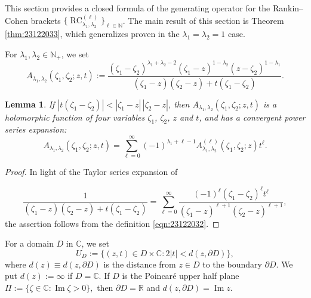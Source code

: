 \documentclass[12pt]{amsart}
\newcommand{\RC}{\operatorname{RC}}
\theoremstyle{plain} %
\newtheorem{lemma}{Lemma} %
\theoremstyle{definition} %
\theoremstyle{remark} %
\begin{document}
This section provides a closed formula
 of the generating operator
 for the Rankin--Cohen brackets
 $\{\RC_{\lambda_1, \lambda_2}^{(\ell)}\}_{\ell \in {\mathbb{N}}}$.  
The main result of this section is Theorem \ref{thm:23122033}, 
 which generalizes
 \cite[Thm.\ 2.3]{KPgen}
 proven in the $\lambda_1=\lambda_2=1$ case.  





For $\lambda_1, \lambda_2 \in {\mathbb{N}}_+$, 
we set
\begin{equation}
\label{eqn:23122032}
  A_{\lambda_1, \lambda_2}(\zeta_1, \zeta_2;z, t)
:=
  \frac
  {(\zeta_1-\zeta_2)^{\lambda_1+\lambda_2-2}
  (\zeta_1-z)^{1-\lambda_2}
  (z-\zeta_2)^{1-\lambda_1}}
  {(\zeta_1-z) (\zeta_2-z)+t(\zeta_1-\zeta_2)}.  
\end{equation}


\begin{lemma}
\label{lem:ATaylor}
If 
$
  |t(\zeta_1-\zeta_2)|< |\zeta_1-z| \, |\zeta_2-z|
$, 
 then 
 $A_{\lambda_1, \lambda_2}(\zeta_1, \zeta_2;z,t)$ is a holomorphic function 
 of four variables
 $\zeta_1$, $\zeta_2$, $z$ and $t$, 
 and has a convergent power series expansion:
\[
  A_{\lambda_1, \lambda_2}(\zeta_1, \zeta_2;z,t)
  =\sum_{\ell=0}^{\infty}
   (-1)^{\lambda_1+\ell-1} A_{\lambda_1, \lambda_2}^{(\ell)}(\zeta_1, \zeta_2;z)t^{\ell}.  
\]
\end{lemma}

\begin{proof}
In light of the Taylor series expansion of 

\[
  \frac 1 {(\zeta_1-z) (\zeta_2-z)+t(\zeta_1-\zeta_2)}
  =
  \sum_{\ell=0}^{\infty}
  \frac{(-1)^{\ell} (\zeta_1-\zeta_2)^{\ell} t ^{\ell}}{(\zeta_1-z)^{\ell+1}(\zeta_2-z)^{\ell+1}}, 
\]
the assertion follows from the definition \eqref{eqn:23122032}.  
\end{proof}

For a domain $D$ in ${\mathbb{C}}$, 
 we set 
\begin{equation}
\label{eqn:UD}
  U_D:=\{(z,t) \in D \times {\mathbb{C}}:
  2|t|< d(z, \partial D)\}, 
\end{equation}
 where $d(z)\equiv d(z,\partial D)$ is the distance from $z \in D$
 to the boundary $\partial D$.  
We put $d(z):=\infty$ if $D={\mathbb{C}}$.  
If $D$ is the Poincar{\'e} upper half plane
$
  \Pi:=\{\zeta \in {\mathbb{C}}: \operatorname{Im} \zeta >0\}, 
$
 then $\partial D={\mathbb{R}}$
 and $d(z, \partial D)=\operatorname{Im}z$.  
\end{document}
